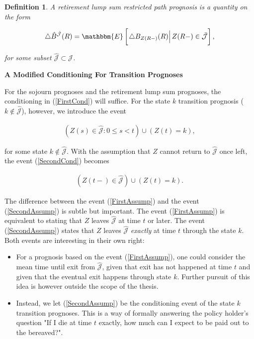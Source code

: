 \documentclass{article}
\newcommand{\1}[1]{\mathbbm{1}_{\left\lbrace #1 \right\rbrace}}
\newcommand{\econd}[2][def]{\mathbbm{E} \left[ \left. #1 \right| #2 \right]}
\theoremstyle{break}
\newtheorem{definition}{Definition}[section]
\theoremstyle{remark}
\numberwithin{equation}{section}
\begin{document}
\begin{definition} \label{DefLumpRestr}
	A retirement lump sum restricted path prognosis is a quantity on the form
	
	\begin{gather*}
		\triangle \hat{B}^{\hat{\mathcal{J}}}(R) = \econd[\triangle B_{Z(R-)}(R)]{Z(R-) \in \bar{\mathcal{J}}},
	\end{gather*}
	
	for some subset $\hat{\mathcal{J}} \subset \mathcal{J}$.
\end{definition}

\textbf{A Modified Conditioning For Transition Prognoses}

For the sojourn prognoses and the retirement lump sum prognoses, the conditioning in (\ref{FirstCond}) will suffice. For the state $k$ transition prognosis ($k \notin \hat{\mathcal{J}}$), however, we introduce the event

\begin{align} \label{SecondCond}
	\left( Z(s) \in \hat{\mathcal{J}} : 0 \leq s < t\right) \cup \left(Z(t) = k \right),
\end{align}

for some state $k \notin \hat{\mathcal{J}}$. With the assumption that $Z$ cannot return to $\hat{\mathcal{J}}$ once left, the event (\ref{SecondCond}) becomes

\begin{align} \label{SecondAssump}
	\left( Z(t-) \in \hat{\mathcal{J}}\right) \cup \left(Z(t) = k \right).
\end{align}

The difference between the event (\ref{FirstAssump}) and the event (\ref{SecondAssump}) is subtle but important. The event (\ref{FirstAssump}) is equivalent to stating that $Z$ leaves $ \hat{\mathcal{J}}$ at time $t$ or later. The event (\ref{SecondAssump}) states that $Z$ leaves $\hat{\mathcal{J}}$ \textit{exactly} at time $t$ through the state $k$. Both events are interesting in their own right:

\begin{itemize}
	\item For a prognosis based on the event (\ref{FirstAssump}), one could consider the mean time until exit from $\hat{\mathcal{J}}$, given that exit has not happened at time $t$ and given that the eventual exit happens through state $k$. Further pursuit of this idea is however outside the scope of the thesis.
	\item Instead, we let (\ref{SecondAssump}) be the conditioning event of the state $k$ transition prognoses. This is a way of formally answering the policy holder's question "If I die at time $t$ exactly, how much can I expect to be paid out to the bereaved?".
\end{itemize}
\end{document}
